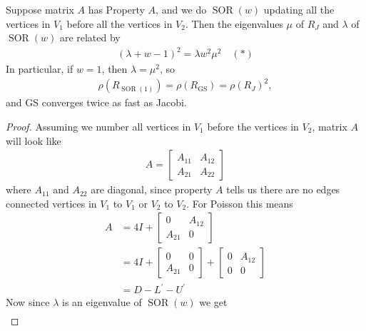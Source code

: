 \documentclass[11pt]{article}
\numberwithin{equation}{section}
\begin{document}
\begin{theorem}
    Suppose matrix $A$ has Property $A$, and we do $\operatorname{SOR}(w)$ updating all the vertices in $V_1$ before all the vertices in $V_2$.
    Then the eigenvalues $\mu$ of $R_J$ and $\lambda$ of $\operatorname{SOR}(w)$ are related by \begin{align*}
        (\lambda+w-1)^{2}=\lambda w^{2} \mu^{2} \quad (*)
    \end{align*}
    In particular, if $w=1$, then $\lambda=\mu^{2}$, so \begin{align*}
        \rho(R_{\operatorname{SOR}(1)}) = \rho(R_{\operatorname{GS}}) = \rho(R_J)^2,    
    \end{align*}
     and GS converges twice as fast as Jacobi.
    \begin{proof}
        Assuming we number all vertices in $V_1$ before the vertices in $V_2$, matrix $A$ will look like
        \begin{align*}
            A=\left[\begin{array}{ll}
                A_{11} & A_{12} \\
                A_{21} & A_{22}
                \end{array}\right]
        \end{align*}
        where $A_{11}$ and $A_{22}$ are diagonal, since property $A$ tells us there are no edges connected vertices in $V_1$ to $V_1$ or $V_2$ to $V_2$. For Poisson this means \begin{align*}
            A &= 4 I+\left[\begin{array}{ll}
                0 & A_{1 2} \\
                A_{21} & 0
                \end{array}\right] \\
            &= 4 I+\left[\begin{array}{ll}
                0 & 0 \\
                A_{21} & 0
                \end{array}\right]+\left[\begin{array}{ll}
                    0 & A_{1 2} \\
                    0 & 0
                    \end{array}\right] \\
            &= D - L^\prime - U^\prime
        \end{align*}
        Now since $\lambda$ is an eigenvalue of $\operatorname{SOR}(w)$ we get \begin{align*}

\end{align*}
\end{proof}
\end{theorem}
\end{document}
